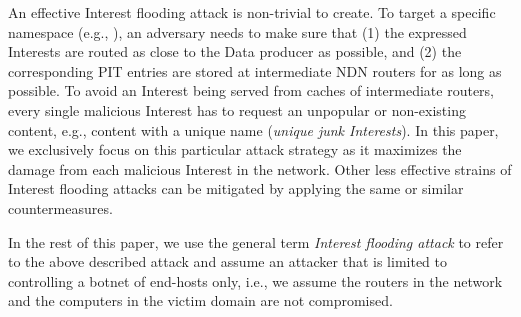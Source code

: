 
An effective Interest flooding attack is non-trivial to create.
To target a specific namespace (e.g., ), an adversary needs to make sure that (1) the expressed Interests are routed as close to the Data producer as possible, and (2) the corresponding PIT entries are stored at intermediate NDN routers for as long as possible.
To avoid an Interest being served from caches of intermediate routers, every single malicious Interest has to request an unpopular or non-existing content, e.g., content with a unique name (\emph{unique junk Interests}). In this paper, we exclusively focus on this particular attack strategy as it maximizes the damage from each malicious Interest in the network. Other less effective strains of Interest flooding attacks can be mitigated by applying the same or similar countermeasures.  

In the rest of this paper, we use the general term \emph{Interest flooding attack} to refer to the above described attack and assume an attacker that is limited to controlling a botnet of end-hosts only, i.e., we assume the routers in the network and the computers in the victim domain are not compromised.




